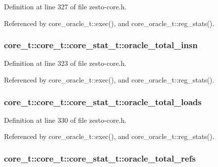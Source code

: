 Definition at line 327 of file zesto-core.h.

Referenced by core\_\-oracle\_\-t::exec(), and core\_\-oracle\_\-t::reg\_\-stats().
\subsubsection[{oracle\_\-total\_\-insn}]{ core\_\-t::core\_\-t::core\_\-stat\_\-t::oracle\_\-total\_\-insn}\label{structcore__t_1_1core__stat__t_94cb8397eca3462590b990f8e428e0be}




Definition at line 323 of file zesto-core.h.

Referenced by core\_\-oracle\_\-t::exec(), and core\_\-oracle\_\-t::reg\_\-stats().
\subsubsection[{oracle\_\-total\_\-loads}]{ core\_\-t::core\_\-t::core\_\-stat\_\-t::oracle\_\-total\_\-loads}\label{structcore__t_1_1core__stat__t_7e3c8f66ac3b8562f5f65a84c99a19c9}




Definition at line 330 of file zesto-core.h.

Referenced by core\_\-oracle\_\-t::exec(), and core\_\-oracle\_\-t::reg\_\-stats().
\subsubsection[{oracle\_\-total\_\-refs}]{ core\_\-t::core\_\-t::core\_\-stat\_\-t::oracle\_\-total\_\-refs}\label{structcore__t_1_1core__stat__t_7fe9765f24e107db96dbb0fb43085d11}




